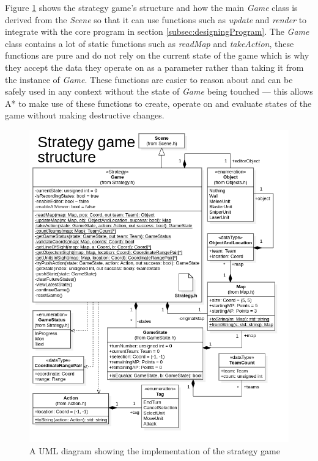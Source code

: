 \documentclass[11pt, a4paper]{report}
\begin{document}
Figure \ref{fig:strategyGameUML} shows the strategy game's structure and how the main \emph{Game} class is derived from the \emph{Scene} so that it can use functions such as \emph{update} and \emph{render} to integrate with the core program in section \ref{subsec:designingProgram}. The \emph{Game} class contains a lot of static functions such as \emph{readMap} and \emph{takeAction}, these functions are pure and do not rely on the current state of the game which is why they accept the data they operate on as a parameter rather than taking it from the instance of \emph{Game}. These functions are easier to reason about and can be safely used in any context without the state of \emph{Game} being touched --- this allows A* to make use of these functions to create, operate on and evaluate states of the game without making destructive changes.

\begin{figure}[!h]
  \centering
  \includegraphics[width=\linewidth]{img/strategy_game_structure.png}
  \caption{A UML diagram showing the implementation of the strategy game}
  \label{fig:strategyGameUML}
\end{figure}
\end{document}
